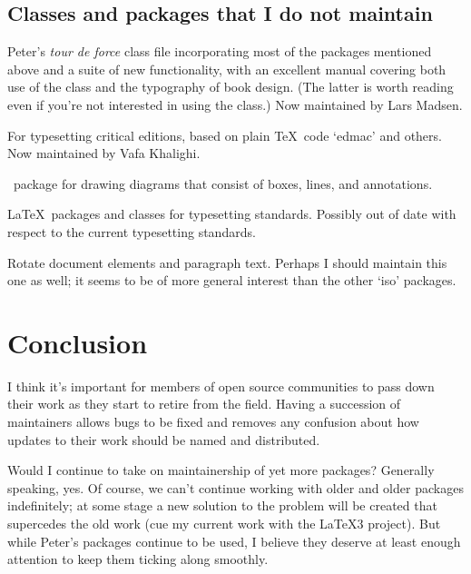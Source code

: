 \documentclass{ltugboat}
\begin{document}
\subsection{Classes and packages that I do not maintain}

\begin{description}[font=\normalfont\sffamily]
\item [memoir] Peter's \emph{tour de force} class file incorporating most of the packages mentioned above and a suite of new functionality, with an excellent manual covering both use of the class and the typography of book design. (The latter is worth reading even if you're not interested in using the class.) Now maintained by Lars Madsen.
\item [ledmac/ledpar/ledarab]  For typesetting critical editions, based on plain \TeX\ code `\textsf{edmac}' and others. Now maintained by Vafa Khalighi.
\item [expressg] \MP\ package for drawing diagrams that consist of boxes, lines, and annotations.
\item [iso \& iso10303] \LaTeX\ packages and classes for typesetting  standards. Possibly out of date with respect to the current typesetting standards.
\item [isorot] Rotate document elements and paragraph text. Perhaps I should maintain this one as well; it seems to be of more general interest than the other `\textsf{iso}' packages.
\end{description}

\section{Conclusion}

I think it's important for members of open source communities to pass down their work as they start to retire from the field. Having a succession of maintainers allows bugs to be fixed and removes any confusion about how updates to their work should be named and distributed.

Would I continue to take on maintainership of yet more packages? Generally speaking, yes. Of course, we can't continue working with older and older packages indefinitely; at some stage a new solution to the problem will be created that supercedes the old work (cue my current work with the \LaTeX3 project). But while Peter's packages continue to be used, I believe they deserve at least enough attention to keep them ticking along smoothly.
\end{document}
